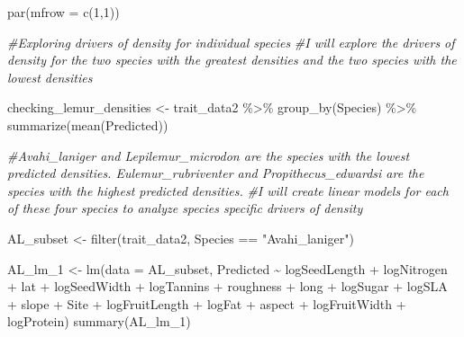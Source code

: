 \documentclass[
  12pt,
]{article}
\newenvironment{Shaded}{\begin{snugshade}}{\end{snugshade}}
\newcommand{\AttributeTok}[1]{\textcolor[rgb]{0.77,0.63,0.00}{#1}}
\newcommand{\CommentTok}[1]{\textcolor[rgb]{0.56,0.35,0.01}{\textit{#1}}}
\newcommand{\DecValTok}[1]{\textcolor[rgb]{0.00,0.00,0.81}{#1}}
\newcommand{\FunctionTok}[1]{\textcolor[rgb]{0.00,0.00,0.00}{#1}}
\newcommand{\NormalTok}[1]{#1}
\newcommand{\OtherTok}[1]{\textcolor[rgb]{0.56,0.35,0.01}{#1}}
\newcommand{\SpecialCharTok}[1]{\textcolor[rgb]{0.00,0.00,0.00}{#1}}
\newcommand{\StringTok}[1]{\textcolor[rgb]{0.31,0.60,0.02}{#1}}
\begin{document}
\begin{Shaded}
\begin{Highlighting}[]
\FunctionTok{par}\NormalTok{(}\AttributeTok{mfrow =} \FunctionTok{c}\NormalTok{(}\DecValTok{1}\NormalTok{,}\DecValTok{1}\NormalTok{))}




\CommentTok{\#Exploring drivers of density for individual species}
\CommentTok{\#I will explore the drivers of density for the two species with the greatest densities and the two species with the lowest densities}

\NormalTok{checking\_lemur\_densities }\OtherTok{\textless{}{-}}
\NormalTok{  trait\_data2 }\SpecialCharTok{\%\textgreater{}\%} 
  \FunctionTok{group\_by}\NormalTok{(Species) }\SpecialCharTok{\%\textgreater{}\%} 
  \FunctionTok{summarize}\NormalTok{(}\FunctionTok{mean}\NormalTok{(Predicted))}

\CommentTok{\#Avahi\_laniger and Lepilemur\_microdon are the species with the lowest predicted densities. Eulemur\_rubriventer and Propithecus\_edwardsi are the species with the highest predicted densities. }
\CommentTok{\#I will create linear models for each of these four species to analyze species specific drivers of density}

\NormalTok{AL\_subset }\OtherTok{\textless{}{-}} \FunctionTok{filter}\NormalTok{(trait\_data2, Species }\SpecialCharTok{==} \StringTok{"Avahi\_laniger"}\NormalTok{)}

\NormalTok{AL\_lm\_1 }\OtherTok{\textless{}{-}} \FunctionTok{lm}\NormalTok{(}\AttributeTok{data =}\NormalTok{ AL\_subset, Predicted }\SpecialCharTok{\textasciitilde{}}\NormalTok{ logSeedLength }\SpecialCharTok{+}\NormalTok{ logNitrogen }\SpecialCharTok{+}\NormalTok{ lat }\SpecialCharTok{+}\NormalTok{ logSeedWidth }\SpecialCharTok{+}\NormalTok{ logTannins }\SpecialCharTok{+}\NormalTok{ roughness }\SpecialCharTok{+}\NormalTok{ long }\SpecialCharTok{+}\NormalTok{ logSugar }\SpecialCharTok{+}\NormalTok{ logSLA }\SpecialCharTok{+}\NormalTok{ slope }\SpecialCharTok{+}\NormalTok{ Site }\SpecialCharTok{+}\NormalTok{ logFruitLength }\SpecialCharTok{+}\NormalTok{ logFat }\SpecialCharTok{+}\NormalTok{ aspect }\SpecialCharTok{+}\NormalTok{ logFruitWidth }\SpecialCharTok{+}\NormalTok{ logProtein)}
\FunctionTok{summary}\NormalTok{(AL\_lm\_1)}
\end{Highlighting}
\end{Shaded}
\end{document}

